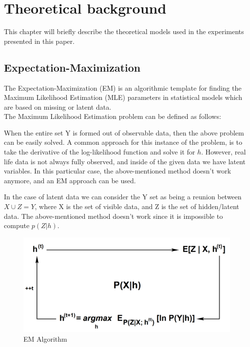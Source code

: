 \chapter{Theoretical background}
\label{TheoreticalBackground}

This chapter will briefly describe the theoretical models used in the experiments presented in this paper.

\section{Expectation-Maximization}
The Expectation-Maximization (EM) is an algorithmic template for finding the Maximum Likelihood Estimation (MLE) parameters in statistical models which are based on missing or latent data.\\
The Maximum Likelihood Estimation problem can be defined as follows:


 When the entire set Y is formed out of observable data, then the above problem can be easily solved. A common approach for this instance of the problem, is to take the derivative of the log-likelihood function and solve it for $h$. However, real life data is not always fully observed, and inside of the given data we have latent variables. In this particular case, the above-mentioned method doesn't work anymore, and an EM approach can be used.
 
 In the case of latent data we can consider the Y set as being a reunion between $X \cup Z = Y$, where X is the set of visible data, and Z is the set of hidden/latent data. The above-mentioned method doesn't work since it is impossible to compute $p(Z | h)$.
 
 \begin{figure}[H]
 	\includegraphics[width=\textwidth]{Pictures/004EMScheme.png}
 	\caption{EM Algorithm \cite{emCiortuz}}
 	\label{EmScheme}
 \end{figure}
 
